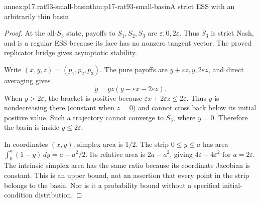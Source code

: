 \begin{annexitem}{annex:p17.rat93-small-basin}{thm:p17-rat93-small-basin}{A strict ESS with an arbitrarily thin basin}
\begin{proof}
At the all-\(S_3\) state, payoffs to \(S_1,S_2,S_3\) are
\(\varepsilon,0,2\varepsilon\). Thus \(S_3\) is strict Nash,
and is a regular ESS because its face has no nonzero tangent vector.
The proved replicator bridge gives asymptotic stability.

Write \((x,y,z)=(p_1,p_2,p_3)\). The pure payoffs are
\(y+\varepsilon z,y,2\varepsilon z\), and direct averaging gives
\[
 \dot y=yz(y-\varepsilon x-2\varepsilon z).
\]
When \(y>2\varepsilon\), the bracket is positive because
\(\varepsilon x+2\varepsilon z\leq2\varepsilon\).
Thus \(y\) is nondecreasing there (constant when \(z=0\))
and cannot cross back below its initial positive value. Such a
trajectory cannot converge to \(S_3\), where \(y=0\).
Therefore the basin is inside \(y\leq2\varepsilon\).

In coordinates \((x,y)\), simplex area is \(1/2\). The strip
\(0\leq y\leq a\) has area
\(\int_0^a(1-y)\,dy=a-a^2/2\). Its relative area is
\(2a-a^2\), giving \(4\varepsilon-4\varepsilon^2\) for
\(a=2\varepsilon\). The intrinsic simplex area has the same
ratio because its coordinate Jacobian is constant. This is an upper
bound, not an assertion that every point in the strip belongs to
the basin. Nor is it a probability bound without a specified
initial-condition distribution.
\end{proof}
\end{annexitem}

